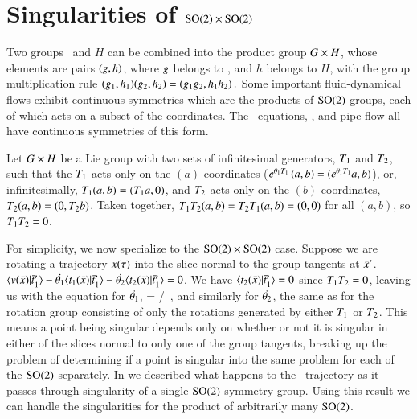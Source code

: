 \documentclass[preprint,12pt]{elsarticle} %
\begin{document}
\section{Singularities of $\textrm{SO}(2) \times \textrm{SO}(2)$}
	\label{sec:singulProd}

Two groups \Group\ and $H$ can be combined into the {product group}
$G \times H$, whose elements are pairs $(g,h)$, where $g$
belongs to \Group, and $h$ belongs to $H$, with the group multiplication
rule
\(
(g_1,h_1)(g_2,h_2)=(g_1 g_2,h_1 h_2)
\,.
\)
Some important fluid-dynamical flows exhibit continuous symmetries which
are the products of $\textrm{SO}(2)$ groups, each of which acts on a subset  of
the {\statesp} coordinates. The \KS\ equations,
{\pCf}, and pipe
flow all have continuous symmetries of this form.

Let $G \times H$ be a Lie group with two sets of infinitesimal
generators, $T_1$ and $T_2$, such that the $T_1$ acts only on the
$(a)$ coordinates ($e^{{\bf \theta}_1 T_1} \,
(a,b)=(e^{{\bf \theta}_1T_1}a,b)$), or, infinitesimally,
$T_1(a,b)=(T_1 a,0)$, and $T_2$ acts only on the $(b)$ coordinates,
$T_2(a,b)=(0,T_2 b)$. Taken together, $T_1 T_2(a,b) = T_2
T_1(a,b) = (0,0) $ for all $(a,b)$, so $T_1 T_2=0$.

For simplicity, we now specialize to the  $\textrm{SO}(2) \times \textrm{SO}(2)$ case.
Suppose we are rotating a trajectory $x(\tau)$ into the slice normal
to the group tangents at $\bar{x}'$.
$\braket{\vel(\sspRed)}{\sliceTan{1}}-\dot{\gSpace_1} \braket{
\groupTan_1(\sspRed)}{\sliceTan{1}}-\dot{\gSpace_2} \braket{
\groupTan_2(\sspRed)}{\sliceTan{1}}=0$. We have
$\braket{\groupTan_2(\sspRed)}{\sliceTan{1}}=0$ since $T_1 T_2=0$,
leaving us with the equation for $\dot{{\bf \theta}_1}$,
\beq
{}=     {} /
                     {}
\,,
\eeq
and similarly for $\dot{{\bf \theta}_2}$, the same as 
for the rotation group consisting of only the rotations generated by
either $T_1$ or $T_2$.  This means a point being singular depends
only on whether or not it is singular in either of the slices normal to
only one of the group tangents, breaking up the problem of determining if
a point is singular into the same problem for each of the $\textrm{SO}(2)$
separately. In  we described what happens to the
\reducedsp\ trajectory as it passes through singularity of a single
$\textrm{SO}(2)$ symmetry group. Using this result we can handle the
singularities for the product of arbitrarily many $\textrm{SO}(2)$.



\end{document}
